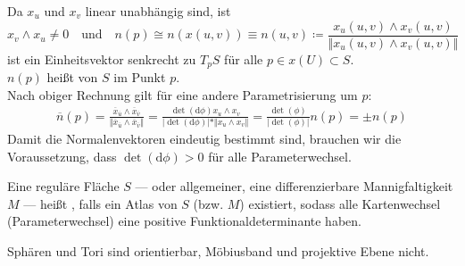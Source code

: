 \begin{definition}[Normalenvektor]
  Da $ x_u $ und $ x_v $ linear unabhängig sind, ist
  \begin{equation*}
    x_v \wedge x_u \neq 0 \quad \text{und} \quad n(p) \cong n(x(u,v)) \equiv n(u,v) \coloneqq \frac{x_u(u,v) \wedge x_v(u,v)}{\Vert x_u(u,v) \wedge x_v(u,v) \Vert}
  \end{equation*}
  ist ein Einheitsvektor senkrecht zu $ T_pS $ für alle $ p \in x(U) \subset S $. \\
  $ n(p) $ heißt \label{def:normalenvektor} von $ S $ im Punkt $ p $. \\
  Nach obiger Rechnung gilt für eine andere Parametrisierung um $ p $:
  \begin{align*}
    \overline{n}(p) = \frac{\overline{x}_{\overline{u}} \wedge \overline{x}_{\overline{v}}}{\Vert \overline{x}_{\overline{u}} \wedge \overline{x}_{\overline{v}} \Vert} = \frac{\det(\text{d}\phi)x_u \wedge x_v}{\vert \det(\text{d}\phi) \vert * \Vert x_u \wedge x_v \Vert} = \frac{\det(\phi)}{\vert \det(\phi) \vert} n(p) = \pm n(p)
  \end{align*}
  Damit die Normalenvektoren eindeutig bestimmt sind, brauchen wir die Voraussetzung, dass $ \det(\text{d}\phi) > 0 $ für alle Parameterwechsel.
\end{definition}

\begin{definition}[Orientierbarkeit]
  Eine reguläre Fläche $ S $ --- oder allgemeiner, eine differenzierbare Mannigfaltigkeit $ M $ --- heißt \label{def:orientierbarkeit}, falls ein Atlas von $ S $ (bzw. $ M $) existiert, sodass alle Kartenwechsel (Parameterwechsel) eine positive Funktionaldeterminante haben.
\end{definition}

\begin{example}
  Sphären und Tori sind orientierbar, Möbiusband und projektive Ebene nicht.
\end{example}

